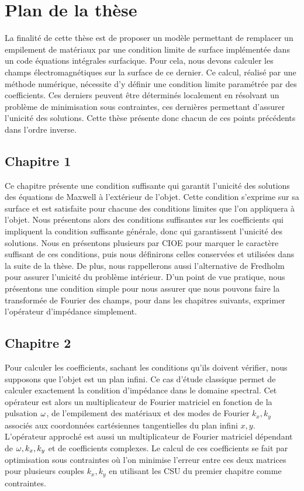 \section*{Plan de la thèse}

La finalité de cette thèse est de proposer un modèle permettant de remplacer un empilement de matériaux par une condition limite de surface implémentée dans un code équations intégrales surfacique.
Pour cela, nous devons calculer les champs électromagnétiques sur la surface de ce dernier.
Ce calcul, réalisé par une méthode numérique, nécessite d'y définir une condition limite paramétrée par des coefficients.
Ces derniers peuvent être déterminés localement en résolvant un problème de minimisation sous contraintes, ces dernières permettant d'assurer l'unicité des solutions.
Cette thèse présente donc chacun de ces points précédents dans l'ordre inverse.

\subsection*{Chapitre 1}
Ce chapitre présente une condition suffisante qui garantit l'unicité des solutions des équations de Maxwell à l'extérieur de l'objet.
Cette condition s'exprime sur sa surface et est satisfaite pour chacune des conditions limites que l'on appliquera à l'objet. 
Nous présentons alors des conditions suffisantes sur les coefficients qui impliquent la condition suffisante générale, donc qui garantissent l'unicité des solutions.
Nous en présentons plusieurs par CIOE pour marquer le caractère suffisant de ces conditions, puis nous définirons celles conservées et utilisées dans la suite de la thèse.
De plus, nous rappellerons aussi l'alternative de Fredholm pour assurer l'unicité du problème intérieur. D'un point de vue pratique, nous présentons une condition simple pour nous assurer que nous pouvons faire la transformée de Fourier des champs, pour dans les chapitres suivants, exprimer l'opérateur d'impédance simplement.

\subsection*{Chapitre 2}
Pour calculer les coefficients, sachant les conditions qu'ils doivent vérifier, nous supposons que l'objet est un plan infini. Ce cas d'étude classique permet de calculer exactement la condition d’impédance dans le domaine spectral. 
Cet opérateur est alors un multiplicateur de Fourier matriciel en fonction de la pulsation \(\omega\), de l'empilement des matériaux et des modes de Fourier \(k_x,k_y\) associés aux coordonnées cartésiennes tangentielles du plan infini \(x,y\).
L'opérateur approché est aussi un multiplicateur de Fourier matriciel dépendant de \(\omega, k_x, k_y\) et de coefficients complexes.
Le calcul de ces coefficients se fait par optimisation sous contraintes où l'on minimise l'erreur entre ces deux matrices pour plusieurs couples \(k_x,k_y\) en utilisant les CSU du premier chapitre comme contraintes.

